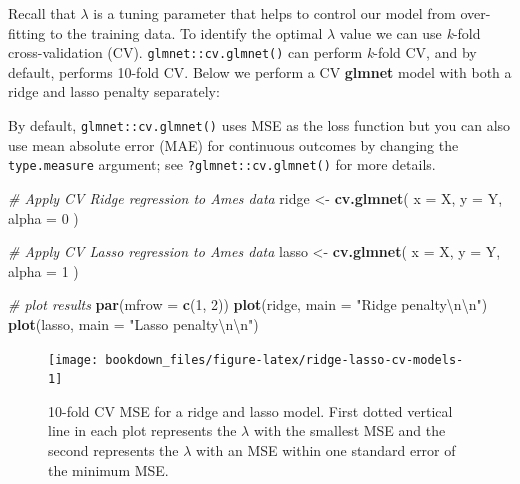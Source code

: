 \documentclass[]{krantz}
\makeatletter
\newenvironment{Shaded}{\begin{snugshade}}{\end{snugshade}}
\newcommand{\CharTok}[1]{\textcolor[rgb]{0.5,0.5,0.5}{#1}}
\newcommand{\CommentTok}[1]{\textcolor[rgb]{0.37,0.37,0.37}{\textit{#1}}}
\newcommand{\DataTypeTok}[1]{\textcolor[rgb]{0.27,0.27,0.27}{#1}}
\newcommand{\DecValTok}[1]{\textcolor[rgb]{0.06,0.06,0.06}{#1}}
\newcommand{\KeywordTok}[1]{\textcolor[rgb]{0.27,0.27,0.27}{\textbf{#1}}}
\newcommand{\NormalTok}[1]{#1}
\newcommand{\StringTok}[1]{\textcolor[rgb]{0.5,0.5,0.5}{#1}}
\newenvironment{kframe}{%
\medskip{}
\setlength{\fboxsep}{.8em}
 \def\at@end@of@kframe{}%
 \ifinner\ifhmode%
  \def\at@end@of@kframe{\end{minipage}}%
  \begin{minipage}{\columnwidth}%
 \fi\fi%
 \def\FrameCommand##1{\hskip\@totalleftmargin \hskip-\fboxsep
 \colorbox{shadecolor}{##1}\hskip-\fboxsep
     \hskip-\linewidth \hskip-\@totalleftmargin \hskip\columnwidth}%
 \MakeFramed {\advance\hsize-\width
   \@totalleftmargin\z@ \linewidth\hsize
   \@setminipage}}%
 {\par\unskip\endMakeFramed%
 \at@end@of@kframe}
\newenvironment{block}[1]
  {
  \begin{itemize}
  \renewcommand{\labelitemi}{
    \raisebox{-.7\height}[0pt][0pt]{
      {\setkeys{Gin}{width=3em,keepaspectratio}\texttt{[image: icons/\#1]}}
    }
  }
  \setlength{\fboxsep}{1em}
  \begin{kframe}
  \item
  }
  {
  \end{kframe}
  \end{itemize}
  }
\newenvironment{tip}
  {\begin{block}{tip}}
  {\end{block}}
\renewenvironment{Shaded}{\begin{kframe}}{\end{kframe}}
\makeatother
\begin{document}
Recall that \(\lambda\) is a tuning parameter that helps to control our model from over-fitting to the training data. To identify the optimal \(\lambda\) value we can use \emph{k}-fold cross-validation (CV). \texttt{glmnet::cv.glmnet()} can perform \emph{k}-fold CV, and by default, performs 10-fold CV. Below we perform a CV \textbf{glmnet} model with both a ridge and lasso penalty separately:

\begin{tip}
By default, \texttt{glmnet::cv.glmnet()} uses MSE as the loss function
but you can also use mean absolute error (MAE) for continuous outcomes
by changing the \texttt{type.measure} argument; see
\texttt{?glmnet::cv.glmnet()} for more details.
\end{tip}

\begin{Shaded}
\begin{Highlighting}[]
\CommentTok{# Apply CV Ridge regression to Ames data}
\NormalTok{ridge <-}\StringTok{ }\KeywordTok{cv.glmnet}\NormalTok{(}
  \DataTypeTok{x =}\NormalTok{ X,}
  \DataTypeTok{y =}\NormalTok{ Y,}
  \DataTypeTok{alpha =} \DecValTok{0}
\NormalTok{)}

\CommentTok{# Apply CV Lasso regression to Ames data}
\NormalTok{lasso <-}\StringTok{ }\KeywordTok{cv.glmnet}\NormalTok{(}
  \DataTypeTok{x =}\NormalTok{ X,}
  \DataTypeTok{y =}\NormalTok{ Y,}
  \DataTypeTok{alpha =} \DecValTok{1}
\NormalTok{)}

\CommentTok{# plot results}
\KeywordTok{par}\NormalTok{(}\DataTypeTok{mfrow =} \KeywordTok{c}\NormalTok{(}\DecValTok{1}\NormalTok{, }\DecValTok{2}\NormalTok{))}
\KeywordTok{plot}\NormalTok{(ridge, }\DataTypeTok{main =} \StringTok{"Ridge penalty}\CharTok{\textbackslash{}n\textbackslash{}n}\StringTok{"}\NormalTok{)}
\KeywordTok{plot}\NormalTok{(lasso, }\DataTypeTok{main =} \StringTok{"Lasso penalty}\CharTok{\textbackslash{}n\textbackslash{}n}\StringTok{"}\NormalTok{)}
\end{Highlighting}
\end{Shaded}

\begin{figure}

{\centering \texttt{[image: bookdown\_files/figure-latex/ridge-lasso-cv-models-1]} 

}

\caption{10-fold CV MSE for a ridge and lasso model. First dotted vertical line in each plot represents the $\lambda$ with the smallest MSE and the second represents the $\lambda$ with an MSE within one standard error of the minimum MSE.}\label{fig:ridge-lasso-cv-models}
\end{figure}
\end{document}
